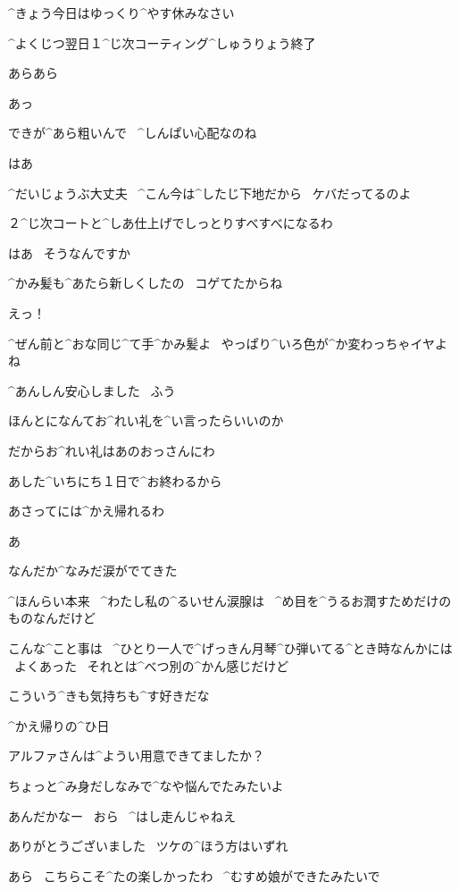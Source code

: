 \Sensei ^{きょう}{今日}はゆっくり^{やす}{休}みなさい

\page
\Narrator ^{よくじつ}{翌日}１^{じ}{次}コーティング^{しゅうりょう}{終了}

\Sensei あらあら

\Alpha あっ

\Sensei できが^{あら}{粗}いんで
\ ^{しんぱい}{心配}なのね

\Alpha はあ

\Sensei ^{だいじょうぶ}{大丈夫}
\ ^{こん}{今}は^{したじ}{下地}だから
\ ケバだってるのよ

\page
\Sensei ２^{じ}{次}コートと^{しあ}{仕上}げでしっとりすべすべになるわ

\Alpha はあ
\ そうなんですか

\Sensei ^{かみ}{髪}も^{あたら}{新}しくしたの
\ コゲてたからね

\Alpha えっ！

\Sensei ^{ぜん}{前}と^{おな}{同}じ^{て}{手}^{かみ}{髪}よ
\ やっぱり^{いろ}{色}が^{か}{変}わっちゃイヤよね

\Alpha ^{あんしん}{安心}しました
\ ふう

\Alpha ほんとになんてお^{れい}{礼}を^{い}{言}ったらいいのか

\Sensei だからお^{れい}{礼}はあのおっさんにわ

\Sensei あした^{いちにち}{１日}で^{お}{終}わるから

\Sensei あさってには^{かえ}{帰}れるわ

\page
\Alpha あ

\Alpha なんだか^{なみだ}{涙}がでてきた

\Alpha ^{ほんらい}{本来}
\ ^{わたし}{私}の^{るいせん}{涙腺}は
\ ^{め}{目}を^{うるお}{潤}すためだけのものなんだけど

\Alpha こんな^{こと}{事}は
\ ^{ひとり}{一人}で^{げっきん}{月琴}^{ひ}{弾}いてる^{とき}{時}なんかには
\ よくあった
\ それとは^{べつ}{別}の^{かん}{感}じだけど

\Alpha こういう^{きも}{気持}ちも^{す}{好}きだな

\page
\Narrator ^{かえ}{帰}りの^{ひ}{日}

\Ojisan アルファさんは^{ようい}{用意}できてましたか？

\Sensei ちょっと^{み}{身}だしなみで^{なや}{悩}んでたみたいよ

\Ojisan あんだかなー
\ おら
\ ^{はし}{走}んじゃねえ

\Ojisan ありがとうございました
\ ツケの^{ほう}{方}はいずれ

\Sensei あら
\ こちらこそ^{たの}{楽}しかったわ
\ ^{むすめ}{娘}ができたみたいで

